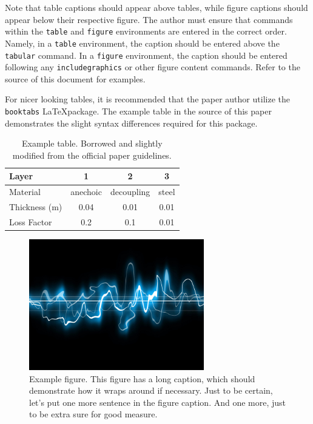 \documentclass{internoise2012}
\begin{document}
Note that table captions should appear above tables, while figure
captions should appear below their respective figure. The author must
ensure that commands within the \texttt{table} and \texttt{figure}
environments are entered in the correct order. Namely, in a
\texttt{table} environment, the caption should be entered above the
\texttt{tabular} command. In a \texttt{figure} environment, the
caption should be entered following any \texttt{includegraphics} or
other figure content commands. Refer to the source of this document
for examples.

For nicer looking tables, it is recommended that the paper author
utilize the \texttt{booktabs} \LaTeX package. The example table in the
source of this paper demonstrates the slight syntax differences
required for this package.

\begin{table}[ht]
  \centering
  \caption{Example table. Borrowed and slightly modified from the
    official paper guidelines.}
  \begin{tabular}{lccc}
    \toprule
    Layer & 1 & 2 & 3 \\
    \midrule
    Material & anechoic & decoupling & steel \\
    Thickness (m) & 0.04 & 0.01 & 0.01 \\
    Loss Factor & 0.2 & 0.1 & 0.01 \\
    \bottomrule
  \end{tabular}
  \label{tab:example-table}
\end{table}

\begin{figure}[ht]
  \centering
  \includegraphics[width=3in]{sound}
  \caption{Example figure. This figure has a long caption, which
    should demonstrate how it wraps around if necessary. Just to be
    certain, let's put one more sentence in the figure caption. And
    one more, just to be extra sure for good measure.}
  \label{fig:example-figure}
\end{figure}
\end{document}
